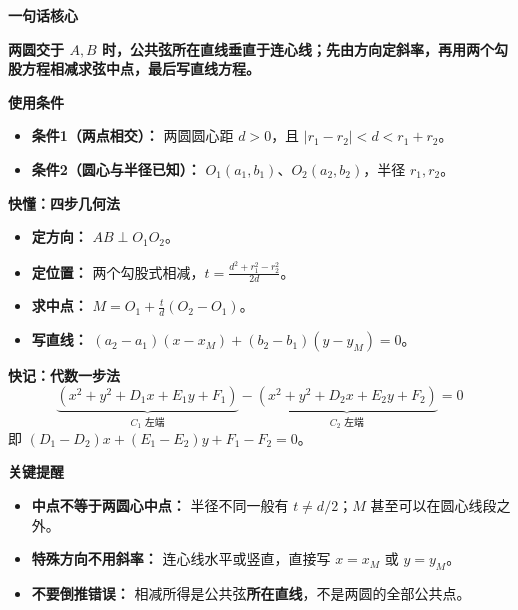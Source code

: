 \begin{summarybox}
	\textbf{\textcolor{CSummary}{一句话核心}}

	\textbf{两圆交于 $A,B$ 时，公共弦所在直线垂直于连心线；先由方向定斜率，再用两个勾股方程相减求弦中点，最后写直线方程。}

	\medskip
	\textbf{\textcolor{CSummary}{使用条件}}
	\begin{itemize}[leftmargin=*, itemsep=0.5em, topsep=0.4em]
		\item \textbf{条件1（两点相交）：} 两圆圆心距 $d>0$，且 $|r_1-r_2|<d<r_1+r_2$。
		\item \textbf{条件2（圆心与半径已知）：} $O_1(a_1,b_1)$、$O_2(a_2,b_2)$，半径 $r_1,r_2$。
	\end{itemize}

	\medskip
	\textbf{\textcolor{CSummary}{快懂：四步几何法}}
	\begin{itemize}[leftmargin=*, itemsep=0.4em, topsep=0.3em]
		\item \textbf{定方向：} $AB\perp O_1O_2$。
		\item \textbf{定位置：} 两个勾股式相减，$\displaystyle t=\frac{d^2+r_1^2-r_2^2}{2d}$。
		\item \textbf{求中点：} $\displaystyle M=O_1+\frac{t}{d}(O_2-O_1)$。
		\item \textbf{写直线：} $\displaystyle (a_2-a_1)(x-x_M)+(b_2-b_1)(y-y_M)=0$。
	\end{itemize}

	\medskip
	\textbf{\textcolor{CSummary}{快记：代数一步法}}
	\[
		\boxed{\underbrace{(x^2+y^2+D_1x+E_1y+F_1)}_{C_1\text{ 左端}}-\underbrace{(x^2+y^2+D_2x+E_2y+F_2)}_{C_2\text{ 左端}}=0}
	\]
	即 $(D_1-D_2)x+(E_1-E_2)y+F_1-F_2=0$。

	\medskip
	\textbf{\textcolor{CSummary}{关键提醒}}
	\begin{itemize}[leftmargin=*, itemsep=0.5em, topsep=0.4em]
		\item \textbf{中点不等于两圆心中点：} 半径不同一般有 $t\ne d/2$；$M$ 甚至可以在圆心线段之外。
		\item \textbf{特殊方向不用斜率：} 连心线水平或竖直，直接写 $x=x_M$ 或 $y=y_M$。
		\item \textbf{不要倒推错误：} 相减所得是公共弦\textbf{所在直线}，不是两圆的全部公共点。
	\end{itemize}
\end{summarybox}
